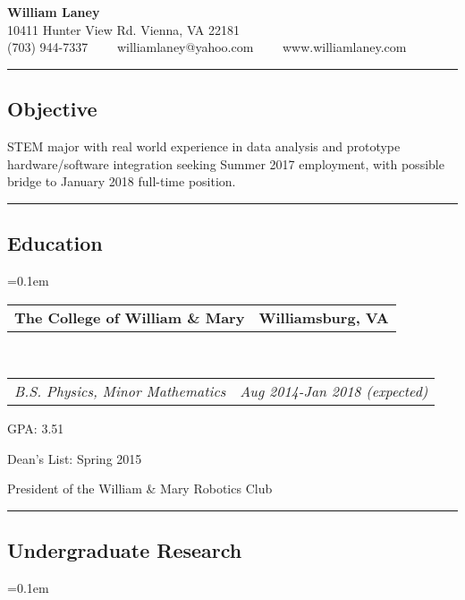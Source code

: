 \documentclass[10pt,letterpaper]{article}
\makeatletter
\newenvironment{indentsection}[1]%
{\begin{list}{}%
	{\setlength{\leftmargin}{#1}}%
	\item[]%
}
{\end{list}}
\newcommand{\headerrow}[2]
{\begin{tabular*}{\linewidth}{l@{\extracolsep{\fill}}r}
	#1 &
	#2 \\
\end{tabular*}}
\makeatother
\begin{document}
\begin{center}
{\LARGE \textbf{William Laney}}\\
\vspace{0.1em}
10411 Hunter View Rd.
Vienna, VA 22181
\\
(703) 944-7337\ \ \textbullet
\ \ williamlaney@yahoo.com\ \ \textbullet
\ \ www.williamlaney.com
\end{center}

\hrule
\vspace{-0.4em}
\subsection*{Objective}

\begin{indentsection}{\parindent}
STEM major with real world experience in data analysis and
prototype hardware/software integration seeking Summer 2017 employment,
with possible bridge to January 2018 full-time position.
\end{indentsection}


\hrule
\vspace{-0.4em}
\subsection*{Education}

	\parskip=0.1em

	\headerrow
		{\textbf{The College of William \& Mary}}
		{\textbf{Williamsburg, VA}}
	\\
	\headerrow
		{\emph{B.S. Physics, Minor Mathematics}}
		{\emph{Aug 2014-Jan 2018 (expected)}}
	\begin{itemize*}
		\item GPA: 3.51
		\item Dean's List: Spring 2015
		\item President of the William \& Mary Robotics Club
	\end{itemize*}



\hrule
\vspace{-0.4em}
\subsection*{Undergraduate Research}

	\parskip=0.1em
\end{document}
